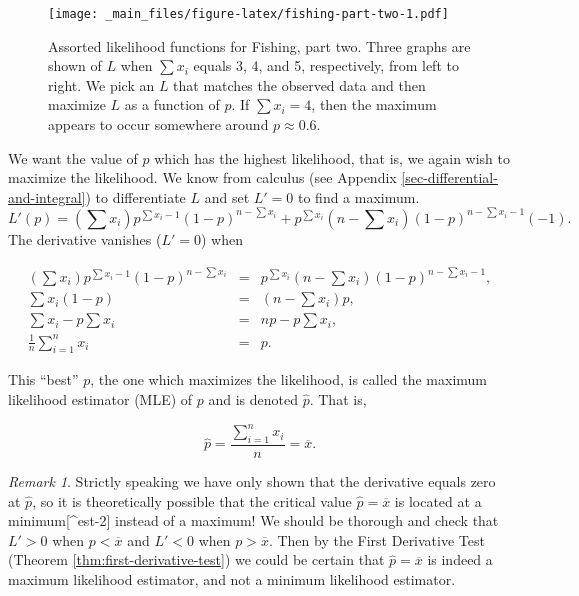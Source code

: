 \documentclass[]{book}
\numberwithin{equation}{chapter}
\numberwithin{figure}{chapter}
\theoremstyle{plain}
\theoremstyle{definition}
\theoremstyle{remark}
\theoremstyle{definition}
\theoremstyle{definition}
\theoremstyle{remark}
\newtheorem*{remark}{Remark}
\begin{document}
\begin{figure}[htbp]
\centering
\texttt{[image: \_main\_files/figure-latex/fishing-part-two-1.pdf]}
\caption{\label{fig:fishing-part-two}\small Assorted likelihood functions for
Fishing, part two. Three graphs are shown of \(L\) when \(\sum x_{i}\)
equals 3, 4, and 5, respectively, from left to right. We pick an \(L\)
that matches the observed data and then maximize \(L\) as a function of
\(p\). If \(\sum x_{i}=4\), then the maximum appears to occur somewhere
around \(p \approx 0.6\).}
\end{figure}








We want the value of \(p\) which has the highest likelihood, that is, we
again wish to maximize the likelihood. We know from calculus (see
Appendix \ref{sec-differential-and-integral}) to differentiate \(L\) and
set \(L'=0\) to find a maximum. \[ L'(p)=\left(\sum
x_{i}\right)p^{\sum x_{i}-1}(1-p)^{n-\sum x_{i}}+p^{\sum
x_{i}}\left(n-\sum x_{i}\right)(1-p)^{n-\sum x_{i}-1}(-1).  \] The
derivative vanishes (\(L'=0\)) when

\begin{eqnarray*}
\left(\sum x_{i}\right)p^{\sum x_{i}-1}(1-p)^{n-\sum x_{i}} & = & p^{\sum x_{i}}\left(n-\sum x_{i}\right)(1-p)^{n-\sum x_{i}-1},\\
\sum x_{i}(1-p) & = & \left(n-\sum x_{i}\right)p,\\
\sum x_{i}-p\sum x_{i} & = & np-p\sum x_{i},\\
\frac{1}{n}\sum_{i=1}^{n}x_{i} & = & p.
\end{eqnarray*}

This ``best'' \(p\), the one which maximizes the likelihood, is called
the maximum likelihood estimator (MLE) of \(p\) and is denoted
\(\hat{p}\). That is,

\begin{equation} 
\hat{p}=\frac{\sum_{i=1}^{n}x_{i}}{n}=\overline{x}.
\end{equation}

\bigskip

\begin{remark}
Strictly speaking we have only shown that the derivative equals zero at
\(\hat{p}\), so it is theoretically possible that the critical value
\(\hat{p}=\overline{x}\) is located at a minimum{[}\^{}est-2{]} instead
of a maximum! We should be thorough and check that \(L'>0\) when
\(p<\overline{x}\) and \(L'<0\) when \(p>\overline{x}\). Then by the
First Derivative Test (Theorem \ref{thm:first-derivative-test}) we could
be certain that \(\hat{p}=\overline{x}\) is indeed a maximum likelihood
estimator, and not a minimum likelihood estimator.
\end{remark}
\end{document}
